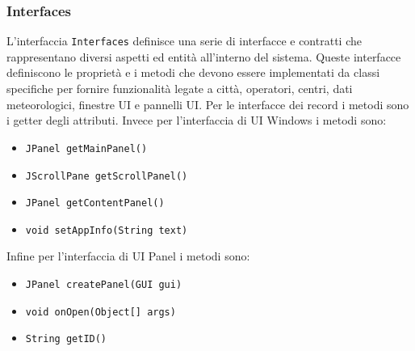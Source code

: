 \subsubsection{Interfaces}
L'interfaccia \texttt{Interfaces} definisce una serie di interfacce e contratti che rappresentano diversi aspetti ed entità all'interno del sistema. 
Queste interfacce definiscono le proprietà e i metodi che devono essere implementati da classi specifiche per fornire funzionalità legate a città, operatori, centri, dati meteorologici, finestre UI e pannelli UI.
Per le interfacce dei record i metodi sono i getter degli attributi.
Invece per l'interfaccia di UI Windows i metodi sono:
\begin{itemize}
    \item \texttt{JPanel getMainPanel()}
    \item \texttt{JScrollPane getScrollPanel()}
    \item \texttt{JPanel getContentPanel()}
    \item \texttt{void setAppInfo(String text)}
    \end{itemize}
Infine per l'interfaccia di UI Panel i metodi sono:
\begin{itemize}
    \item \texttt{JPanel createPanel(GUI gui)}
    \item \texttt{void onOpen(Object[] args)}
    \item \texttt{String getID()}
    \end{itemize}

